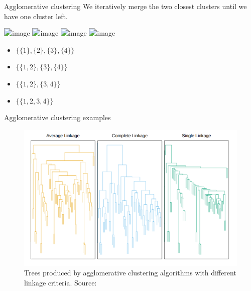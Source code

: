 \documentclass[10pt, compress]{beamer}
\begin{document}
\begin{frame}{Agglomerative clustering}
  We iteratively merge the two closest clusters until 
  we have one cluster left.

  \begin{center}
    \includegraphics<1>{img/agglomerative-clustering-0}
    \includegraphics<2>{img/agglomerative-clustering-1}
    \includegraphics<3>{img/agglomerative-clustering-2}
    \includegraphics<4>{img/agglomerative-clustering-3}

  \end{center}

  \centering
  \begin{itemize}
    \item<1>[] $\{\{1\}, \{2\}, \{3\}, \{4\}\}$\\
    \item<2>[] $\{\{1, 2\}, \{3\}, \{4\}\}$\\
    \item<3>[] $\{\{1, 2\}, \{3, 4\}\}$\\
    \item<4>[] $\{\{1, 2, 3, 4\}\}$\\
  \end{itemize}
\end{frame}

\begin{frame}{Agglomerative clustering examples}
  \begin{figure}
    \includegraphics[frame,width=\textwidth]{img/dendrograms}
    \caption{Trees produced by agglomerative clustering algorithms
    with different linkage criteria. Source: \cite{Hastie2009}}
    \label{fig:dendrograms}
  \end{figure}
\end{frame}
\end{document}
